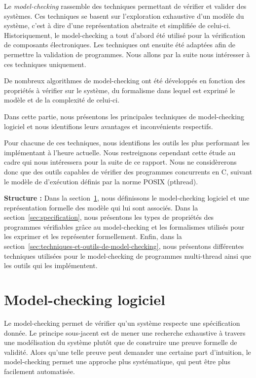 \label{sec:RevLitt}

Le \emph{model-checking} rassemble des techniques permettant de vérifier
et valider des systèmes. Ces techniques se basent sur l'exploration
exhaustive d'un modèle du système, c'est à dire d'une représentation
abstraite et simplifiée de celui-ci. Historiquement, le model-checking a
tout d'abord été utilisé pour la vérification de composants
électroniques. Les techniques ont ensuite été adaptées afin de permettre
la validation de programmes. Nous allons par la suite nous intéresser à
ces techniques uniquement.

De nombreux algorithmes de model-checking ont été développés en fonction
des propriétés à vérifier sur le système, du formalisme dans lequel est
exprimé le modèle et de la complexité de celui-ci.

Dans cette partie, nous présentons les principales techniques de
model-checking logiciel et nous identifions leurs avantages et
inconvénients respectifs.

Pour chacune de ces techniques, nous identifions les outils les plus performant
les implémentant à l'heure actuelle. Nous restreignons cependant cette étude au
cadre qui nous intéressera pour la suite de ce rapport. Nous ne considèrerons
donc que des outils capables de vérifier des programmes concurrents en C,
suivant le modèle de d'exécution définis par la norme POSIX (pthread).

\textbf{Structure :} Dans la section~\ref{sec:model-checking-logiciel}, nous
définissons le model-checking logiciel et une représentation formelle des modèle
qui lui sont associés. Dans la section~\ref{sec:specification}, nous présentons
les types de propriétés des programmes vérifiables grâce au model-checking et
les formalismes utilisés pour les exprimer et les représenter formellement.
Enfin, dans la section~\ref{sec:techniques-et-outils-de-model-checking}, nous
présentons différentes techniques utilisées pour le model-checking de programmes
multi-thread ainsi que les outils qui les implémentent.

\section{Model-checking logiciel}\label{sec:model-checking-logiciel}

Le model-checking permet de vérifier qu'un système respecte une
spécification donnée. Le principe sous-jacent est de mener une recherche
exhaustive à travers une modélisation du système plutôt que de
construire une preuve formelle de validité. Alors qu'une telle preuve
peut demander une certaine part d'intuition, le model-checking permet
une approche plus systématique, qui peut être plus facilement
automatisée.


